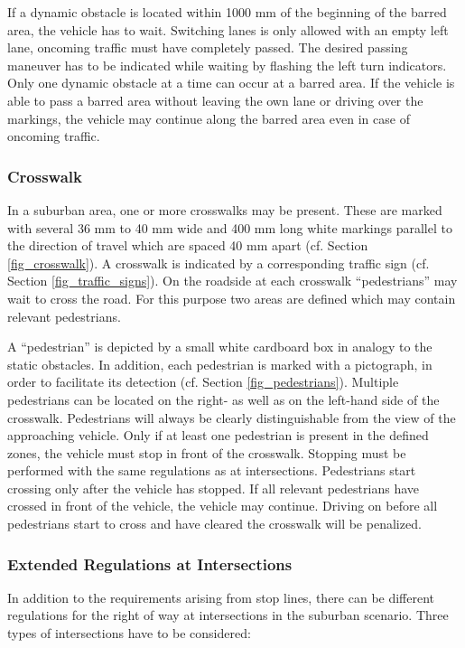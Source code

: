 If a dynamic obstacle is located within 1000 mm of the beginning of the barred
area, the vehicle has to wait. Switching lanes is only allowed with an empty
left lane, oncoming traffic must have completely passed. The desired passing
maneuver has to be indicated while waiting by flashing the left turn
indicators. Only one dynamic obstacle at a time can occur at a barred area. If
the vehicle is able to pass a barred area without leaving the own lane or
driving over the markings, the vehicle may continue along the barred area even
in case of oncoming traffic.

\subsubsection{Crosswalk}

In a suburban area, one or more crosswalks may be present. These are marked
with several 36 mm to 40 mm wide and 400 mm long white markings parallel to the
direction of travel which are spaced 40 mm apart (cf. Section
\ref{fig_crosswalk}). A crosswalk is indicated by a corresponding traffic sign
(cf. Section \ref{fig_traffic_signs}). On the roadside at each crosswalk
“pedestrians” may wait to cross the road. For this purpose two areas are
defined which may contain relevant pedestrians.

A “pedestrian” is depicted by a small white cardboard box in analogy to the
static obstacles. In addition, each pedestrian is marked with a pictograph, in
order to facilitate its detection (cf. Section \ref{fig_pedestrians}). Multiple
pedestrians can be located on the right- as well as on the left-hand side of
the crosswalk. Pedestrians will always be clearly distinguishable from the view
of the approaching vehicle. Only if at least one pedestrian is present in the
defined zones, the vehicle must stop in front of the crosswalk. Stopping must
be performed with the same regulations as at intersections. Pedestrians start
crossing only after the vehicle has stopped. If all relevant pedestrians have
crossed in front of the vehicle, the vehicle may continue. Driving on before
all pedestrians start to cross and have cleared the crosswalk will be
penalized.

\subsubsection{Extended Regulations at Intersections}

In addition to the requirements arising from stop lines, there can be different
regulations for the right of way at intersections in the suburban scenario.
Three types of intersections have to be considered:

